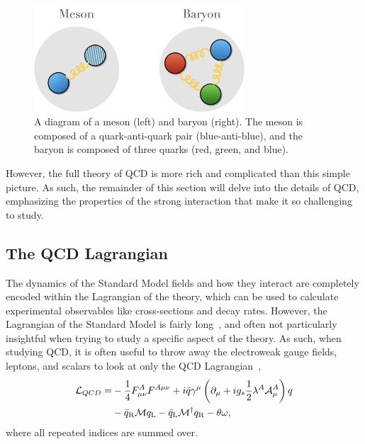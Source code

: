 \begin{figure}[h]
    \centering
    \includegraphics[width=0.7\textwidth]{figures/introduction/meson_baryon_figure.png}
    \caption{A diagram of a meson (left) and baryon (right). The meson is composed of a quark-anti-quark pair (blue-anti-blue), and the baryon is composed of three quarks (red, green, and blue).}
    \label{fig:meson_baryon}
\end{figure}


However, the full theory of QCD is more rich and complicated than this simple picture. As such, the remainder of this section will delve into the details of QCD, emphasizing the properties of the strong interaction that make it so challenging to study.

\subsection{The QCD Lagrangian}
\label{sec:qcd_lagrangian}

The dynamics of the Standard Model fields and how they interact are completely encoded within the Lagrangian of the theory, which can be used to calculate experimental observables like cross-sections and decay rates. However, the Lagrangian of the Standard Model is fairly long~\cite{StandardModelLength1}, and often not particularly insightful when trying to study a specific aspect of the theory. As such, when studying QCD, it is often useful to throw away the electroweak gauge fields, leptons, and scalars to look at only the QCD Lagrangian~\cite{QCDHistory},
%
\begin{align*}
    \label{eq:qcd_lagrangian}
    \mathcal{L}_{Q C D}= & -\frac{1}{4} F_{\mu \nu}^A F^{A \space \mu \nu}+i \bar{q} \gamma^\mu\left(\partial_\mu+i g_s \frac{1}{2} \lambda^A \mathcal{A}_\mu^A\right) q \\
    & -\bar{q}_{\mathrm{R}} \mathcal{M} q_{\mathrm{L}}-\bar{q}_{\mathrm{L}} \mathcal{M}^{\dagger} q_{\mathrm{R}}-\theta \omega,
\end{align*}
%
where all repeated indices are summed over.

